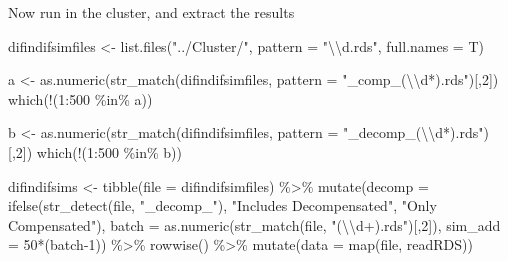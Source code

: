 \documentclass[
]{article}
\newenvironment{Shaded}{\begin{snugshade}}{\end{snugshade}}
\newcommand{\AttributeTok}[1]{\textcolor[rgb]{0.77,0.63,0.00}{#1}}
\newcommand{\DecValTok}[1]{\textcolor[rgb]{0.00,0.00,0.81}{#1}}
\newcommand{\FunctionTok}[1]{\textcolor[rgb]{0.00,0.00,0.00}{#1}}
\newcommand{\NormalTok}[1]{#1}
\newcommand{\OtherTok}[1]{\textcolor[rgb]{0.56,0.35,0.01}{#1}}
\newcommand{\SpecialCharTok}[1]{\textcolor[rgb]{0.00,0.00,0.00}{#1}}
\newcommand{\StringTok}[1]{\textcolor[rgb]{0.31,0.60,0.02}{#1}}
\begin{document}
Now run in the cluster, and extract the results

\begin{Shaded}
\begin{Highlighting}[]
\NormalTok{difindifsimfiles }\OtherTok{\textless{}{-}} \FunctionTok{list.files}\NormalTok{(}\StringTok{"../Cluster/"}\NormalTok{, }\AttributeTok{pattern =} \StringTok{"}\SpecialCharTok{\textbackslash{}\textbackslash{}}\StringTok{d.rds"}\NormalTok{, }
                               \AttributeTok{full.names =}\NormalTok{ T)}

\NormalTok{a }\OtherTok{\textless{}{-}} \FunctionTok{as.numeric}\NormalTok{(}\FunctionTok{str\_match}\NormalTok{(difindifsimfiles, }\AttributeTok{pattern =} \StringTok{"\_comp\_(}\SpecialCharTok{\textbackslash{}\textbackslash{}}\StringTok{d*).rds"}\NormalTok{)[,}\DecValTok{2}\NormalTok{])}
\FunctionTok{which}\NormalTok{(}\SpecialCharTok{!}\NormalTok{(}\DecValTok{1}\SpecialCharTok{:}\DecValTok{500} \SpecialCharTok{\%in\%}\NormalTok{ a))}

\NormalTok{b }\OtherTok{\textless{}{-}} \FunctionTok{as.numeric}\NormalTok{(}\FunctionTok{str\_match}\NormalTok{(difindifsimfiles, }\AttributeTok{pattern =} \StringTok{"\_decomp\_(}\SpecialCharTok{\textbackslash{}\textbackslash{}}\StringTok{d*).rds"}\NormalTok{)[,}\DecValTok{2}\NormalTok{])}
\FunctionTok{which}\NormalTok{(}\SpecialCharTok{!}\NormalTok{(}\DecValTok{1}\SpecialCharTok{:}\DecValTok{500} \SpecialCharTok{\%in\%}\NormalTok{ b))}


\NormalTok{difindifsims }\OtherTok{\textless{}{-}} \FunctionTok{tibble}\NormalTok{(}\AttributeTok{file =}\NormalTok{ difindifsimfiles) }\SpecialCharTok{\%\textgreater{}\%} 
  \FunctionTok{mutate}\NormalTok{(}\AttributeTok{decomp =} \FunctionTok{ifelse}\NormalTok{(}\FunctionTok{str\_detect}\NormalTok{(file, }\StringTok{"\_decomp\_"}\NormalTok{), }
                          \StringTok{"Includes Decompensated"}\NormalTok{, }
                          \StringTok{"Only Compensated"}\NormalTok{),}
         \AttributeTok{batch =} \FunctionTok{as.numeric}\NormalTok{(}\FunctionTok{str\_match}\NormalTok{(file, }\StringTok{"(}\SpecialCharTok{\textbackslash{}\textbackslash{}}\StringTok{d+).rds"}\NormalTok{)[,}\DecValTok{2}\NormalTok{]),}
         \AttributeTok{sim\_add =} \DecValTok{50}\SpecialCharTok{*}\NormalTok{(batch}\DecValTok{{-}1}\NormalTok{)) }\SpecialCharTok{\%\textgreater{}\%} 
  \FunctionTok{rowwise}\NormalTok{() }\SpecialCharTok{\%\textgreater{}\%} 
  \FunctionTok{mutate}\NormalTok{(}\AttributeTok{data =} \FunctionTok{map}\NormalTok{(file, readRDS))}


\end{Highlighting}
\end{Shaded}
\end{document}
